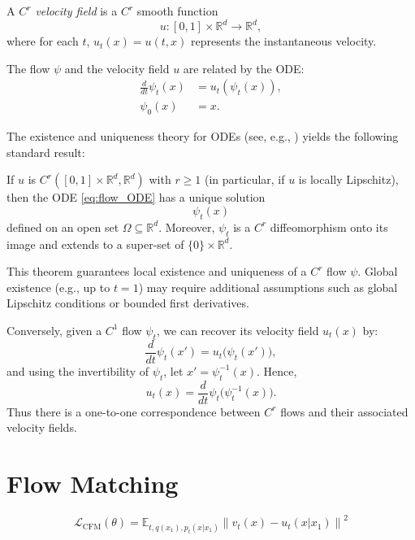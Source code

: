 \documentclass[12pt,a4paper]{article}
\begin{document}
\begin{definition}\label{def:Cr_velocity_field}
A \emph{\( C^r \) velocity field} is a \( C^r \) smooth function
\[
u : [0,1] \times \mathbb{R}^d \to \mathbb{R}^d,
\]
where for each \( t \), \( u_t(x) = u(t,x) \) represents the instantaneous velocity.
\end{definition}

The flow \( \psi \) and the velocity field \( u \) are related by the ODE:
\begin{subequations}\label{eq:flow_ODE}
\begin{align}
\frac{d}{dt} \psi_t(x) &= u_t(\psi_t(x)), \\
\psi_0(x) &= x.
\end{align}
\end{subequations}

The existence and uniqueness theory for ODEs (see, e.g., \cite{Perko2013,Coddington1955}) yields the following standard result:

\begin{theorem}\label{thm:local_existence_uniqueness}
If \(u\) is \(C^r([0,1] \times \mathbb{R}^d,\mathbb{R}^d)\) with \(r \ge 1\) (in particular, if \(u\) is locally Lipschitz), then the ODE \eqref{eq:flow_ODE} has a unique solution
\[
\psi_t(x)
\]
defined on an open set \(\Omega \subseteq \mathbb{R}^d\). Moreover, \(\psi_t\) is a \(C^r\) diffeomorphism onto its image and extends to a super-set of \(\{0\}\times\mathbb{R}^d\).
\end{theorem}

This theorem guarantees local existence and uniqueness of a \(C^r\) flow \(\psi\). Global existence (e.g., up to \(t=1\)) may require additional assumptions such as global Lipschitz conditions or bounded first derivatives.

Conversely, given a \(C^1\) flow \(\psi_t\), we can recover its velocity field \(u_t(x)\) by:
\[
\frac{d}{dt}\psi_t(x') = u_t\bigl(\psi_t(x')\bigr),
\]
and using the invertibility of \(\psi_t\), let \(x' = \psi_t^{-1}(x)\). Hence,
\[
u_t(x) = \frac{d}{dt}\psi_t\bigl(\psi_t^{-1}(x)\bigr).
\]
Thus there is a one-to-one correspondence between \(C^r\) flows and their associated velocity fields.

\section{Flow Matching}

\[\mathcal{L}_{\text{CFM}}(\theta) = \mathbb{E}_{t,q(x_{1}),p_{t}(x|x_{1})}\left\| v_{t}(x) - u_{t}(x|x_{1}) \right\|^{2}\]

\bigskip



\end{document}
